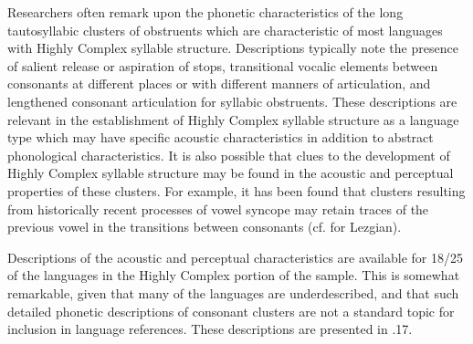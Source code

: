   Researchers often remark upon the phonetic characteristics of the long tautosyllabic clusters of obstruents which are characteristic of most languages with Highly Complex syllable structure. Descriptions typically note the presence of salient release or aspiration of stops, transitional vocalic elements between consonants at different places or with different manners of articulation, and lengthened consonant articulation for syllabic obstruents. These descriptions are relevant in the establishment of Highly Complex syllable structure as a language type which may have specific acoustic characteristics in addition to abstract phonological characteristics. It is also possible that clues to the development of Highly Complex syllable structure may be found in the acoustic and perceptual properties of these clusters. For example, it has been found that clusters resulting from historically recent processes of vowel syncope may retain traces of the previous vowel in the transitions between consonants (cf. \citealt{ChitoranBabaliyeva2007} for Lezgian).



  Descriptions of the acoustic and perceptual characteristics are available for 18/25 of the languages in the Highly Complex portion of the sample. This is somewhat remarkable, given that many of the languages are underdescribed, and that such detailed phonetic descriptions of consonant clusters are not a standard topic for inclusion in language references. These descriptions are presented in .17.






